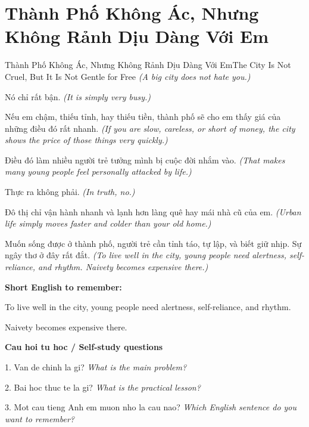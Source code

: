 \section{Thành Phố Không Ác, Nhưng Không Rảnh Dịu Dàng Với Em}
\begin{truyen}{Thành Phố Không Ác, Nhưng Không Rảnh Dịu Dàng Với Em}{The City Is Not Cruel, But It Is Not Gentle for Free}
\textit{(A big city does not hate you.)}

Nó chỉ rất bận.
\textit{(It is simply very busy.)}

Nếu em chậm, thiếu tỉnh, hay thiếu tiền, thành phố sẽ cho em thấy giá của những điều đó rất nhanh.
\textit{(If you are slow, careless, or short of money, the city shows the price of those things very quickly.)}

Điều đó làm nhiều người trẻ tưởng mình bị cuộc đời nhắm vào.
\textit{(That makes many young people feel personally attacked by life.)}

Thực ra không phải.
\textit{(In truth, no.)}

Đô thị chỉ vận hành nhanh và lạnh hơn làng quê hay mái nhà cũ của em.
\textit{(Urban life simply moves faster and colder than your old home.)}

\end{truyen}

\begin{baihoc}
Muốn sống được ở thành phố, người trẻ cần tỉnh táo, tự lập, và biết giữ nhịp. Sự ngây thơ ở đây rất đắt.
\textit{(To live well in the city, young people need alertness, self-reliance, and rhythm. Naivety becomes expensive there.)}
\end{baihoc}

\begin{ghinhoanh}
\textbf{Short English to remember:}

To live well in the city, young people need alertness, self-reliance, and rhythm.

Naivety becomes expensive there.

\end{ghinhoanh}

\begin{tuhocnhanh}
\textbf{Cau hoi tu hoc / Self-study questions}

1. Van de chinh la gi? \textit{What is the main problem?}

2. Bai hoc thuc te la gi? \textit{What is the practical lesson?}

3. Mot cau tieng Anh em muon nho la cau nao? \textit{Which English sentence do you want to remember?}
\end{tuhocnhanh}
\ngancach

